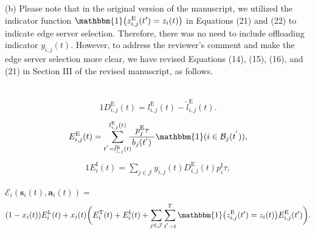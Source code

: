 \documentclass[12pt,draftclsnofoot,onecolumn]{IEEEtran}
\newcommand{\rev}[1]{{\color{blue}#1}} %
\newcommand{\rev}[1]{#1}
\newenvironment{my}[2]%
{\begin{list}{}%
{\setlength{\rightmargin}{#1}\setlength{\leftmargin}{#2}}%


 \item[]{}

} {\end{list}}
\begin{document}
\begin{enumerate}
(b) Please note that in the original version of the manuscript, we utilized the indicator function $\mathbbm{1}\big(z_{i,j}^{\text{E}}(t') = z_i(t)\big)$ in Equations (21) and (22) to indicate edge server selection. Therefore, there was no need to include offloading indicator $y_{i,j}(t)$. However, to address the reviewer’s comment and make the edge server selection more clear, we have revised Equations (14), (15), (16), and (21) in Section III of the revised manuscript, as follows.\vspace{-7mm}
		\begin{my}{1cm}{1cm}
	\rev{
		{\ 
\begin{alignat}{1}
     D_{i,j}^{\text{E}}(t) =  l_{i,j}^{\text{E}}(t)-\hat{l}_{i,j}^{\text{E}}(t).
	\label{14}  
\end{alignat}
\begin{alignat}{1}
    E_{i,j}^{\text{E}}(t) =  \sum_{t^{'}=\hat{l}_{i,j}^{\text{E}}(t)}^{l_{i,j}^{\text{E}}(t)}\hspace{-2mm}{\, p_j^{\text{E}} \tau \over \,\, b_j(t^{'})\,\,}\mathbbm{1}(i \in \mathcal{B}_j(t^{'})), 
	\label{15}  
\end{alignat}
\begin{alignat}{1}
   E_{i}^{\text{I}}(t) =  \sum_{j \in \mathcal{J}}y_{i,j}(t) D_{i,j}^{\text{E}}(t) p_i^{\text{I}} \tau, 
	\label{16}
\end{alignat}
\setcounter{equation}{20}

$\mathcal{E}_i(\boldsymbol{s}_i(t),\boldsymbol{a}_i(t)) = $
	\begin{alignat}{1}
		(1-x_i(t)) E_i^{\text{L}}(t)+ x_i(t) \bigg( E_i^{\text{T}}(t) +   E_i^{\text{I}}(t) +  \sum\limits_{j \in \mathcal{J}}  \sum\limits_{t^{'}=t}^{T}\mathbbm{1}\big(z_{i,j}^{\text{E}}(t') = z_i(t)\big)
		E_{i,j}^{\text{E}}(t')\bigg).
		\label{22}  
\end{alignat}

}}
\end{my} \vspace{3mm}


\end{enumerate}
\end{document}

